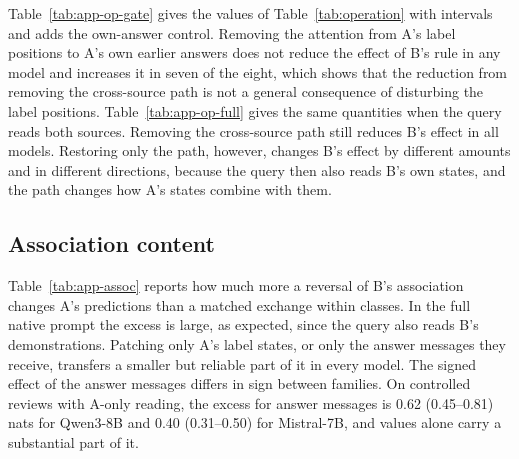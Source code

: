 Table~\ref{tab:app-op-gate} gives the values of Table~\ref{tab:operation} with intervals and adds the own-answer control.
Removing the attention from A's label positions to A's own earlier answers does not reduce the effect of B's rule in any model and increases it in seven of the eight, which shows that the reduction from removing the cross-source path is not a general consequence of disturbing the label positions.
Table~\ref{tab:app-op-full} gives the same quantities when the query reads both sources.
Removing the cross-source path still reduces B's effect in all models.
Restoring only the path, however, changes B's effect by different amounts and in different directions, because the query then also reads B's own states, and the path changes how A's states combine with them.

\begin{table}[t]
\centering\small
{}
\caption{Native operation with A-only reading (controlled reviews, shared words; $\Delta$ in nats, 95\% intervals). A negative reduction is an increase.}
\label{tab:app-op-gate}
\end{table}

\begin{table}[t]
\centering\small
{}
\caption{Native operation when the query reads both sources. Last column: effect with only the path minus effect with all attention from A to B blocked.}
\label{tab:app-op-full}
\end{table}

\subsection{Association content}
\label{app:association}

Table~\ref{tab:app-assoc} reports how much more a reversal of B's association changes A's predictions than a matched exchange within classes.
In the full native prompt the excess is large, as expected, since the query also reads B's demonstrations.
Patching only A's label states, or only the answer messages they receive, transfers a smaller but reliable part of it in every model.
The signed effect of the answer messages differs in sign between families.
On controlled reviews with A-only reading, the excess for answer messages is 0.62 (0.45--0.81) nats for Qwen3-8B and 0.40 (0.31--0.50) for Mistral-7B, and values alone carry a substantial part of it.

